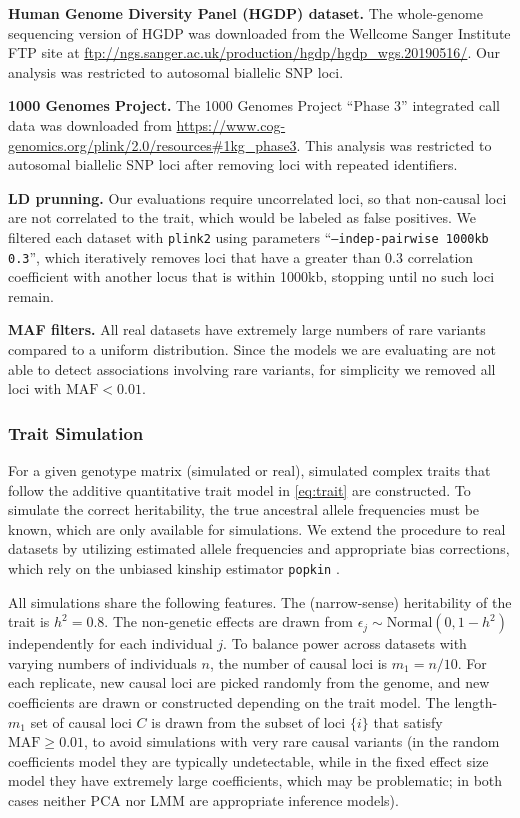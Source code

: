 \documentclass[11pt]{article}
\begin{document}
\textbf{Human Genome Diversity Panel (HGDP) dataset.}
The whole-genome sequencing version of HGDP \citep{bergstrom_insights_2020} was downloaded from the Wellcome Sanger Institute FTP site at \url{ftp://ngs.sanger.ac.uk/production/hgdp/hgdp_wgs.20190516/}.
Our analysis was restricted to autosomal biallelic SNP loci.

\textbf{1000 Genomes Project.}
The 1000 Genomes Project ``Phase 3'' integrated call data \citep{the_1000_genomes_project_consortium_map_2010, 1000_genomes_project_consortium_integrated_2012} was downloaded from \url{https://www.cog-genomics.org/plink/2.0/resources#1kg_phase3}.
This analysis was restricted to autosomal biallelic SNP loci after removing loci with repeated identifiers.

\textbf{LD prunning.}
Our evaluations require uncorrelated loci, so that non-causal loci are not correlated to the trait, which would be labeled as false positives.
We filtered each dataset with \texttt{plink2} using parameters ``\texttt{--indep-pairwise 1000kb 0.3}'', which iteratively removes loci that have a greater than 0.3 correlation coefficient with another locus that is within 1000kb, stopping until no such loci remain.

\textbf{MAF filters.}
All real datasets have extremely large numbers of rare variants compared to a uniform distribution.
Since the models we are evaluating are not able to detect associations involving rare variants, for simplicity we removed all loci with $\text{MAF} < 0.01$.

\subsubsection{Trait Simulation}

For a given genotype matrix (simulated or real), simulated complex traits that follow the additive quantitative trait model in \cref{eq:trait} are constructed.
To simulate the correct heritability, the true ancestral allele frequencies \pit must be known, which are only available for simulations.
We extend the procedure to real datasets by utilizing estimated allele frequencies and appropriate bias corrections, which rely on the unbiased kinship estimator \texttt{popkin} \citep{ochoa_estimating_2021}.

All simulations share the following features.
The (narrow-sense) heritability of the trait is $h^2 = 0.8$.
The non-genetic effects are drawn from $\epsilon_j \sim \text{Normal}(0, 1 - h^2 )$ independently for each individual $j$.
To balance power across datasets with varying numbers of individuals $n$, the number of causal loci is $m_1 = n / 10$.
For each replicate, new causal loci are picked randomly from the genome, and new coefficients are drawn or constructed depending on the trait model.
The length-$m_1$ set of causal loci $C$ is drawn from the subset of loci $\{ i \}$ that satisfy $\text{MAF} \ge 0.01$, to avoid simulations with very rare causal variants (in the random coefficients model they are typically undetectable, while in the fixed effect size model they have extremely large coefficients, which may be problematic; in both cases neither PCA nor LMM are appropriate inference models).
\end{document}
